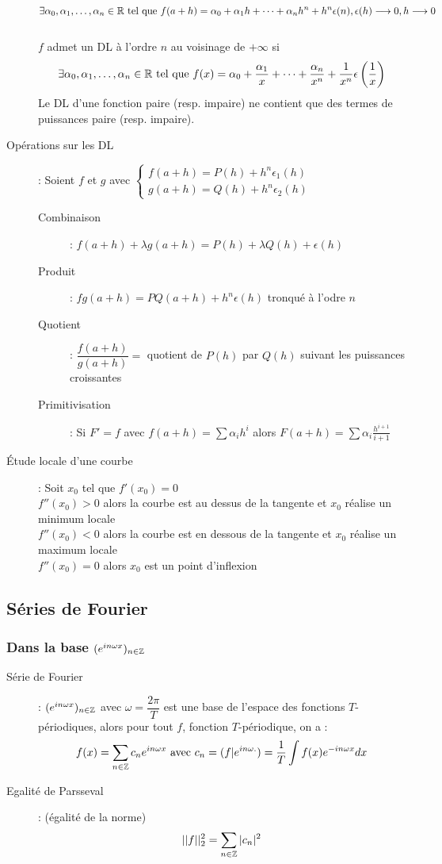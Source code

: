 \begin{description}
    \[ \exists\alpha_0 , \alpha_1 , \dots, \alpha_n \in\mathbb{R}\textrm{ tel que } f(a + h) = \alpha_0 + \alpha_1 h + \dots + \alpha_n h^n + h^n \epsilon(n), \epsilon(h)\longrightarrow 0, h\longrightarrow 0 \]
    \\$f$ admet un DL à l’ordre $n$ au voisinage de $+\infty$ si
    \[ \exists\alpha_0,\alpha_1,\dots,\alpha_n\in\mathbb{R}\textrm{ tel que } f(x)=\alpha_0+\frac{\alpha_1}{x}+\dots+\frac{\alpha_n}{x^n}+\frac{1}{x^n}\epsilon\left(\frac{1}{x}\right) \]
    Le DL d’une fonction paire (resp. impaire) ne contient que des termes de puissances paire (resp. impaire).
\item[Opérations sur les DL] : Soient $f$ et $g$ avec
    $\begin{cases}
        f(a+h)=P(h)+h^n\epsilon_1(h)\\
        g(a+h)=Q(h)+h^n\epsilon_2(h)
    \end{cases}$
\begin{description}
    \item[Combinaison] : $f(a+h)+\lambda g(a+h)=P(h)+\lambda Q(h)+\epsilon(h)$
    \item[Produit] : $fg(a+h)=PQ(a+h)+h^n\epsilon(h)$ tronqué à l'odre $n$
    \item[Quotient] : $\dfrac{f(a+h)}{g(a+h)}=$ quotient de $P(h)$ par $Q(h)$ suivant les puissances croissantes
    \item[Primitivisation] : Si $F'=f$ avec $f(a+h)=\sum\alpha_i h^i$ alors $F(a+h)=\sum\alpha_i\frac{h^{i+1}}{i+1}$
\end{description}
\item[Étude locale d'une courbe] : Soit $x_0$ tel que $f'(x_0 ) = 0$
\\$f''(x_0) > 0$ alors la courbe est au dessus de la tangente et $x_0$ réalise un minimum locale
\\$f''(x_0) < 0$ alors la courbe est en dessous de la tangente et $x_0$ réalise un maximum locale
\\$f''(x_0) = 0$ alors $x_0$ est un point d’inflexion
\end{description}
\subsection{Séries de Fourier}
\subsubsection{Dans la base $(e^{in\omega x})_{n\in\mathbb{Z}}$}
\begin{description}
\item[Série de Fourier] : $(e^{in\omega x})_{n\in\mathbb{Z}}$ avec $\omega=\dfrac{2\pi}{T}$ est une base de l'espace des fonctions $T$-périodiques,
    alors pour tout $f$, fonction $T$-périodique, on a :
    \[
        f(x)=\sum_{n\in\mathbb{Z}}c_ne^{in\omega x}
        \textrm{ avec }
        c_n=(f|e^{in\omega .})=\frac{1}{T}\int f(x)e^{-in\omega x}dx
    \]
\item[Egalité de Parsseval] : (égalité de la norme)
    \[
        ||f||_2^2=\sum_{n\in\mathbb{Z}}|c_n|^2
    \]
\end{description}
